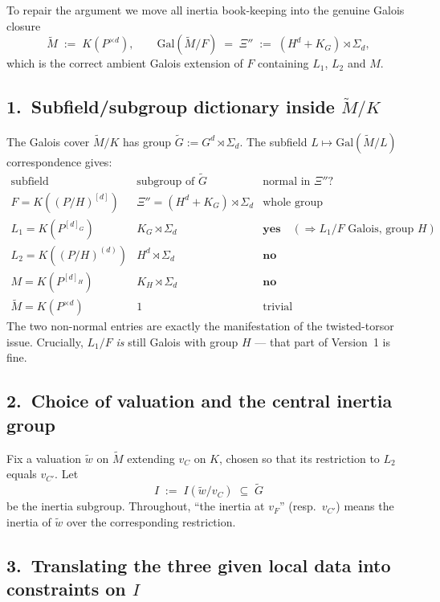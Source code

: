 To repair the argument we move all inertia book-keeping into the genuine Galois closure
\[
\tilde M \;:=\; K(P^{\times d}), \qquad \mathrm{Gal}(\tilde M/F) \;=\; \Xi'' \;:=\; (H^d + K_G) \rtimes \Sigma_d,
\]
which is the correct ambient Galois extension of $F$ containing $L_1$, $L_2$ and $M$.

\subsection*{1.\ Subfield/subgroup dictionary inside $\tilde M/K$}

The Galois cover $\tilde M/K$ has group $\tilde G := G^d \rtimes \Sigma_d$. The subfield $L \mapsto \mathrm{Gal}(\tilde M/L)$ correspondence gives:
\[
\begin{array}{l|l|l}
\text{subfield} & \text{subgroup of }\tilde G & \text{normal in }\Xi''? \\\hline
F = K((P/H)^{[d]}) & \Xi'' = (H^d+K_G)\rtimes \Sigma_d & \text{whole group} \\
L_1 = K(P^{[d]_G}) & K_G \rtimes \Sigma_d & \textbf{yes} \quad(\Rightarrow L_1/F\text{ Galois, group }H) \\
L_2 = K((P/H)^{(d)}) & H^d \rtimes \Sigma_d & \textbf{no} \\
M = K(P^{[d]_H}) & K_H \rtimes \Sigma_d & \textbf{no} \\
\tilde M = K(P^{\times d}) & 1 & \text{trivial}
\end{array}
\]
The two non-normal entries are exactly the manifestation of the twisted-torsor issue. Crucially, $L_1/F$ \emph{is} still Galois with group $H$ — that part of Version~1 is fine.

\subsection*{2.\ Choice of valuation and the central inertia group}

Fix a valuation $\tilde w$ on $\tilde M$ extending $v_C$ on $K$, chosen so that its restriction to $L_2$ equals $v_{C'}$. Let
\[
I \;:=\; I(\tilde w / v_C) \;\subseteq\; \tilde G
\]
be the inertia subgroup. Throughout, ``the inertia at $v_F$'' (resp.\ $v_{C'}$) means the inertia of $\tilde w$ over the corresponding restriction.

\subsection*{3.\ Translating the three given local data into constraints on $I$}

